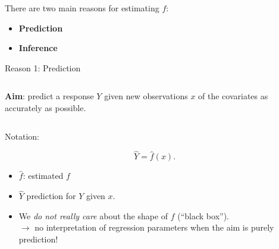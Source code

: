 \documentclass[ignorenonframetext,]{beamer}
\providecommand{\tightlist}{%
  \setlength{\itemsep}{0pt}\setlength{\parskip}{0pt}}
\begin{document}
\begin{frame}

There are two main reasons for estimating \(f\):

\begin{itemize}
\item
  \textbf{Prediction}
\item
  \textbf{Inference}
\end{itemize}

\end{frame}

\begin{frame}

\begin{block}{Reason 1: Prediction}

\(~\)

\textbf{Aim}: predict a response \(Y\) given new observations \(x\) of
the covariates as accurately as possible.

\(~\)

Notation:

\[\hat{Y} = \hat{f}(x).\]

\begin{itemize}
\item
  \(\hat{f}\): estimated \(f\)
\item
  \(\hat{Y}\) prediction for \(Y\) given \(x\).
\end{itemize}

\vspace{2mm}

\begin{itemize}
\tightlist
\item
  We \emph{do not really care} about the shape of \(f\) (``black
  box'').\\
  \(\rightarrow\) no interpretation of regression parameters when the
  aim is purely prediction!
\end{itemize}

\end{block}

\end{frame}
\end{document}
